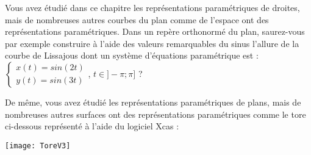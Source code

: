 \documentclass{cornouaille}
\begin{document}
\begin{enigme}
  Vous avez étudié dans ce chapitre les représentations paramétriques
  de droites, mais de nombreuses autres courbes du plan comme de
  l'espace ont des représentations paramétriques.  Dans un repère
  orthonormé du plan, saurez-vous par exemple construire à l'aide des
  valeurs remarquables du sinus l'allure de la courbe de Lissajous
  dont un
  système d'équations paramétrique est : \\
  $\begin{cases}x(t)=sin(2t)\\y(t)=sin(3t) \end{cases}$,
  $t\in]-\pi;\pi]$ ?

  \smallskip

  De même, vous avez étudié les représentations paramétriques de
  plans, mais de nombreuses autres surfaces ont des représentations
  paramétriques comme le tore ci-dessous représenté à l'aide du
  logiciel Xcas :

  \begin{center}
    \texttt{[image: ToreV3]}
  \end{center}
\end{enigme}


\end{document}
